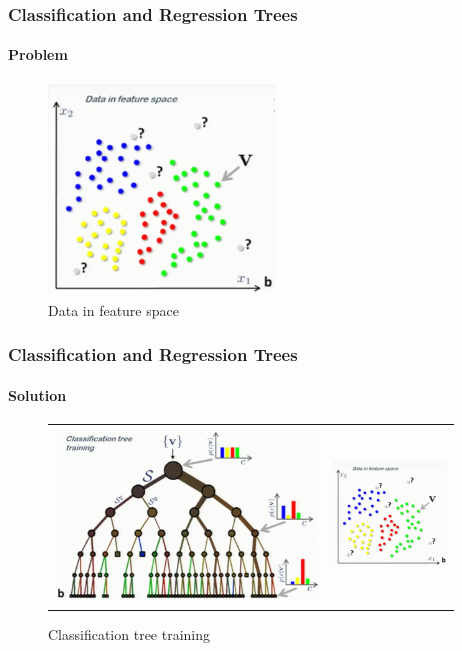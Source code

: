 \begin{frame}
	\frametitle{Classification and Regression Trees}
		\framesubtitle{Problem}
	
		\vfill

		\begin{figure}
			\includegraphics[width=6cm]{./figures/pastedImage0}
			\caption{Data in feature space}
		\end{figure}

		\vspace{-0.5cm}

\end{frame}

\begin{frame}
	\frametitle{Classification and Regression Trees}
		\framesubtitle{Solution}
	
		\begin{center}
		\begin{figure}[h]
		\begin{tabular}{ll}
		\includegraphics[width=7cm]{./figures/pastedImage1}
		&
		\includegraphics[width=3cm]{./figures/pastedImage0}
		\end{tabular}
		\caption{Classification tree training}
		\label{Fig:Race}
		\end{figure}
		\end{center}

\end{frame}

